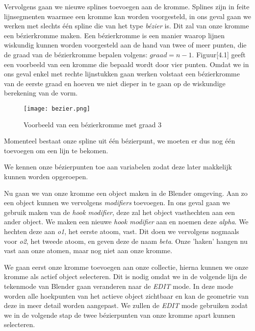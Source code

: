 
Vervolgens gaan we nieuwe splines toevoegen aan de kromme. Splines zijn in feite lijnsegmenten waarmee een kromme kan worden voorgesteld, in ons geval gaan we werken met slechts één spline die van het type \textit{bézier} is. Dit zal van onze kromme een bézierkromme maken. Een bézierkromme is een manier waarop lijnen wiskundig kunnen worden voorgesteld aan de hand van twee of meer punten, die de graad van de 	bézierkromme bepalen volgens: $graad = n - 1$. Figuur[4.1] geeft een voorbeeld van een kromme die bepaald wordt door vier punten. Omdat we in ons geval enkel met rechte lijnstukken gaan werken volstaat een bézierkromme van de eerste graad en hoeven we niet dieper in te gaan op de wiskundige berekening van de vorm.

\begin{figure}[H]
\begin{center}
\texttt{[image: bezier.png]}
\caption{Voorbeeld van een bézierkromme met graad 3 \citep*{BEZ1}}
\end{center}
\end{figure}

Momenteel bestaat onze spline uit één bézierpunt, we moeten er dus nog één toevoegen om een lijn te bekomen.



We kennen onze bézierpunten toe aan variabelen zodat deze later makkelijk kunnen worden opgeroepen.



Nu gaan we van onze kromme een object maken in de Blender omgeving. Aan zo een object kunnen we vervolgens \textit{modifiers} toevoegen. In ons geval gaan we gebruik maken van de \textit{hook modifier}, deze zal het object vasthechten aan een ander object. We maken een nieuwe \textit{hook modifier} aan en noemen deze \textit{alpha}. We hechten deze aan \textit{o1}, het eerste atoom, vast. Dit doen we vervolgens nogmaals voor \textit{o2}, het tweede atoom, en geven deze de naam \textit{beta}. Onze 'haken' hangen nu vast aan onze atomen, maar nog niet aan onze kromme.

  

We gaan eerst onze kromme toevoegen aan onze collectie, hierna kunnen we onze kromme als actief object selecteren. Dit is nodig omdat we in de volgende lijn de tekenmode van Blender gaan veranderen naar de \textit{EDIT} mode. In deze mode worden alle hoekpunten van het actieve object zichtbaar en kan de geometrie van deze in meer detail worden aangepast. We zullen de \textit{EDIT} mode gebruiken zodat we in de volgende stap de twee bézierpunten van onze kromme apart kunnen selecteren. 

